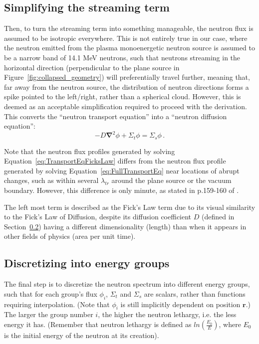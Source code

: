 \documentclass[a4paper, 12pt]{article}
\newcommand{\ve}[1]{\boldsymbol{#1}}
\begin{document}
\subsection{Simplifying the streaming term}
Then, to turn the streaming term into something manageable, the neutron flux is assumed to be isotropic everywhere.
This is not entirely true in our case, where the neutron emitted from the plasma monoenergetic neutron source is assumed to be a narrow band of 14.1 MeV neutrons, such that neutrons streaming in the horizontal direction (perpendicular to the plane source in Figure~\ref{fig:collapsed_geometry}) will preferentially travel further, meaning that, far away from the neutron source, the distribution of neutron directions forms a spike pointed to the left/right, rather than a spherical cloud. However, this is deemed as an acceptable simplification required to proceed with the derivation.
This converts the ``neutron transport equation'' into a ``neutron diffusion equation'':
\begin{equation}\label{eq:TransportEqFicksLaw}
    -D\ve{\nabla}^2\phi + \Sigma_t \phi =\Sigma_s \phi\,.
\end{equation}

Note that the neutron flux profiles generated by solving Equation~\ref{eq:TransportEqFicksLaw} differs from the neutron flux profile generated by solving Equation~\ref{eq:FullTransportEq} near locations of abrupt changes, such as within several $\lambda_{tr}$ around the plane source or the vacuum boundary. However, this difference is only minute, as stated in p.159-160 of \cite{Duderstadt}.

The left most term is described as the Fick's Law term due to its visual similarity to the Fick's Law of Diffusion, despite its diffusion coefficient $D$ (defined in Section~\ref{sec:discretize}) having a different dimensionality (length) than when it appears in other fields of physics (area per unit time).

\subsection{Discretizing into energy groups}\label{sec:discretize}
The final step is to discretize the neutron spectrum into different energy groups, such that for each group's flux $\phi_i$, $\Sigma_t$ and $\Sigma_s$ are scalars, rather than functions requiring interpolation. (Note that $\phi_i$ is still implicitly dependent on position $\ve{r}$.) The larger the group number $i$, the higher the neutron lethargy, i.e. the less energy it has. (Remember that neutron lethargy is defined as $ln(\frac{E_0}{E})$, where $E_0$ is the initial energy of the neutron at its creation).
\end{document}

